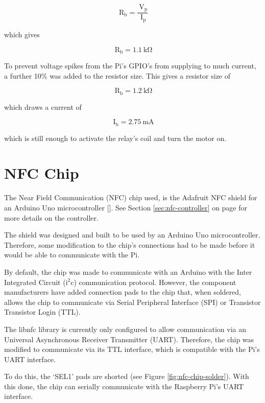 \[
\mathrm{\ R_{b}} = \frac{\mathrm{\ V_{p}}}{\mathrm{\ I_{p}}}
\]

which gives

\[
\mathrm{\ R_{b}} = 1.1\mathrm{\ k\Omega}
\]

To prevent voltage spikes from the Pi's GPIO's from supplying to much current, a
further 10\% was added to the resistor size. This gives a resistor size of

\[\mathrm{\ R_{b}} = 1.2\mathrm{\ k\Omega}\]

which draws a current of 

\[\mathrm{\ I_{b}} = 2.75\mathrm{\ mA} \]

which is still enough to activate the relay's coil and turn the motor on. 

\section{NFC Chip}

The Near Field Communication (NFC) chip used, is the Adafruit NFC shield for an
Arduino Uno microcontroller [\cite{website:adafruit-nfc}]. See Section
\ref{sec:nfc-controller} on page \pageref{sec:nfc-controller} for more details
on the controller.

The shield was designed and built to be used by an Arduino Uno microcontroller.
Therefore, some modification to the chip's connections had to be made before it
would be able to communicate with the Pi.

By default, the chip was made to communicate with an Arduino with the Inter
Integrated Circuit (i$^2$c) communication protocol. However, the component
manufacturers have added connection pads to the chip that, when soldered, allows
the chip to communicate via Serial Peripheral Interface (SPI) or Transistor
Transistor Login (TTL). 

The libnfc library is currently only configured to allow communication via an
Universal Asynchronous Receiver Transmitter (UART). Therefore, the chip was
modified to communicate via its TTL interface, which is compatible with the Pi's
UART interface.

To do this, the `SEL1' pads are shorted (see Figure
\ref{fig:nfc-chip-solder}). With this done, the chip can serially communicate
with the Raspberry Pi's UART interface.

